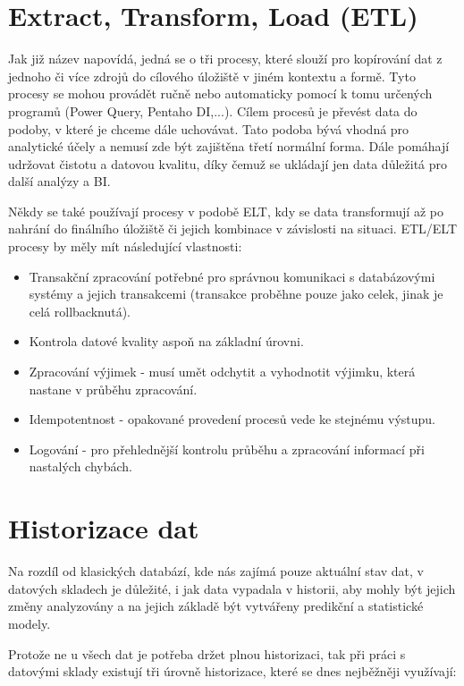 \documentclass[thesis=M,czech]{FITthesis}[2022/10/08]
\begin{document}
\section{Extract, Transform, Load (ETL)}

Jak již název napovídá, jedná se o tři procesy, které slouží pro kopírování dat z jednoho či více zdrojů do cílového úložiště v jiném kontextu a formě. Tyto procesy se mohou provádět ručně nebo automaticky pomocí k tomu určených programů (Power Query, Pentaho DI,...). Cílem procesů je převést data do podoby, v které je chceme dále uchovávat. Tato podoba bývá vhodná pro analytické účely a nemusí zde být zajištěna třetí normální forma. Dále pomáhají udržovat čistotu a datovou kvalitu, díky čemuž se ukládají jen data důležitá pro další analýzy a BI. 

Někdy se také používají procesy v podobě ELT, kdy se data transformují až po nahrání do finálního úložiště či jejich kombinace v závislosti na situaci. ETL/ELT procesy by měly mít následující vlastnosti: \cite{EDW4}

\begin{itemize}
    \item Transakční zpracování potřebné pro správnou komunikaci s databázovými systémy a jejich transakcemi (transakce proběhne pouze jako celek, jinak je celá rollbacknutá).
    \item Kontrola datové kvality aspoň na základní úrovni.
    \item Zpracování výjimek - musí umět odchytit a vyhodnotit výjimku, která nastane v průběhu zpracování.
    \item Idempotentnost - opakované provedení procesů vede ke stejnému výstupu.
    \item Logování - pro přehlednější kontrolu průběhu a zpracování informací při nastalých chybách.
\end{itemize}


\section{Historizace dat}
Na rozdíl od klasických databází, kde nás zajímá pouze aktuální stav dat, v datových skladech je důležité, i jak data vypadala v historii, aby mohly být jejich změny analyzovány a na jejich základě být vytvářeny predikční a statistické modely.

Protože ne u všech dat je potřeba držet plnou historizaci, tak při práci s datovými sklady existují tři úrovně historizace, které se dnes nejběžněji využívají: \cite{EDW3}
\end{document}
